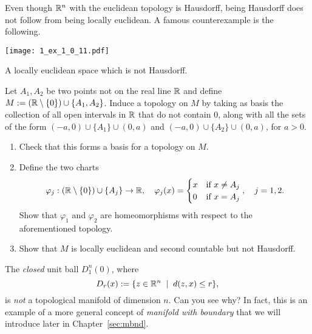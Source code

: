 \begin{exercise}\label{exe:line-two-origins}
	Even though $\mathbb{R}^n$ with the euclidean topology is Hausdorff, being Hausdorff does not follow from being locally euclidean. A famous counterexample is the following.
	\begin{marginfigure}
		\texttt{[image: 1\_ex\_1\_0\_11.pdf]}
		\label{fig:hausdorff-not-locally-euclidean}
		\caption{A locally euclidean space which is not Hausdorff.}
	\end{marginfigure}
	Let $A_1, A_2$ be two points not on the real line $\mathbb{R}$ and define $M:= (\mathbb{R}\setminus\{0\})\cup\{A_1,A_2\}$.
	Induce a topology on $M$ by taking as basis the collection of all open intervals in $\mathbb{R}$ that do not contain $0$, along with all the sets of the form $(-a, 0)\cup\{A_1\}\cup(0,a)$ and $(-a, 0)\cup\{A_2\}\cup(0,a)$, for $a>0$.
	\begin{enumerate}
		\item Check that this forms a basis for a topology on $M$.
		\item Define the two charts
		      \begin{equation}
			      \varphi_j:(\mathbb{R}\setminus\{0\})\cup\{A_j\} \to \mathbb{R}, \quad
			      \varphi_j(x) = \begin{cases} x &\mbox{if } x\neq A_j\\ 0 & \mbox{if } x = A_j \end{cases}, \quad
			      j = 1,2.
		      \end{equation}
		      Show that $\varphi_1$ and $\varphi_2$ are homeomorphisms with respect to the aforementioned topology.
		\item Show that $M$ is locally euclidean and second countable but not Hausdorff.
	\end{enumerate}
\end{exercise}

\begin{example}\label{ex:uball}
	The \emph{closed} unit ball $D_1^n(0)$, where
	\begin{equation}
		D_r(x) := \{z\in\mathbb{R}^n \;\mid\; d(z,x) \leq r\},
	\end{equation}
	is \emph{not} a topological manifold of dimension $n$. Can you see why? In fact, this is an example of a more general concept of \emph{manifold with boundary} that we will introduce later in Chapter~\ref{sec:mbnd}.
\end{example}


